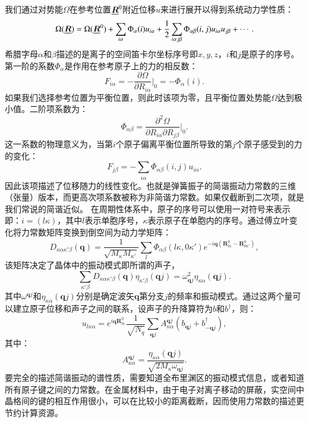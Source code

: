 我们通过对势能$\Omega$在参考位置$\underline{\bm{R}}^0$附近位移$u$来进行展开以得到系统动力学性质：
\begin{equation}
  \Omega(\underline{\bm{R}}) = \Omega(\underline{\bm{R}}^0) + \sum_{i\alpha} \Phi_\alpha(i)u_{i\alpha} + \frac{1}{2} \sum_{i\alpha j\beta} \Phi_{\alpha\beta}(i,j) u_{i\alpha}u_{j\beta} + \cdots .
\end{equation}
希腊字母$\alpha$和$\beta$描述的是离子的空间笛卡尔坐标序号即$x,y,z$，$i$和$j$是原子的序号。第一阶的系数$\Phi_\alpha$是作用在参考原子上的力的相反数：
\begin{equation}
  F_{i\alpha} = -\frac{\partial\Omega}{\partial R_{i\alpha}}\bigg|_0 = -\Phi_\alpha(i).
\end{equation}
如果我们选择参考位置为平衡位置，则此时该项为零，且平衡位置处势能$\Omega$达到极小值。二阶项系数为：
\begin{equation}\label{eq:omega_second_order}
  \Phi_{\alpha\beta} = \frac{\partial^2\Omega}{\partial R_{i\alpha}\partial R_{j\beta}} \bigg|_0 .
\end{equation}
这一系数的物理意义为，当第$i$个原子偏离平衡位置所导致的第$j$个原子感受到的力的变化：
\begin{equation}
  F_{j\beta} = -\sum_{i\alpha} \Phi_{\alpha\beta}(i,j)u_{i\alpha}.
\end{equation}
因此该项描述了位移随力的线性变化。也就是弹簧振子的简谐振动力常数的三维（张量）版本，而更高次项系数被称为非简谐力常数。如果仅截断到二次项，就是我们常说的简谐近似。
在周期性体系中，原子的序号可以使用一对符号来表示即：$i=(l\kappa)$，其中$l$表示单胞序号，$\kappa$表示原子在单胞内的序号。通过傅立叶变化将力常数矩阵变换到倒空间为动力学矩阵：
\begin{equation}
  D_{\kappa\alpha\kappa'\beta}(\bm{q}) = \frac{1}{\sqrt{M_\kappa M_{\kappa'}}} \sum_l \Phi_{\alpha\beta}(l\kappa,0\kappa')e^{-i\bm{q}(\bm{R}^0_{l\kappa}-\bm{R}^0_{0\kappa'})},
\end{equation}
该矩阵决定了晶体中的振动模式即所谓的声子，
\begin{equation}
  \sum_{\kappa'\beta}D_{\kappa\alpha\kappa'\beta}(\bm{q})\eta_{\kappa'\beta}(\bm{q}j) = \omega^2_{\bm{q}j}\eta_{\kappa\alpha}(\bm{q}j).
\end{equation}
其中$\omega^{\bm{q}j}$和$\eta_{\kappa\alpha}(\bm{q}j)$分别是确定波矢$\bm{q}$第分支$j$的频率和振动模式。通过这两个量可以建立原子位移和声子之间的联系，设声子的升降算符为$b$和$b^{\dagger}$，则：
\begin{equation}
  u_{l\kappa\alpha} = e^{i\bm{q}\bm{R}^0_{l\kappa}}\frac{1}{\sqrt{N_q}} \sum_{\bm{q}j} A^{\bm{q}j}_{\kappa\alpha}(b_{\bm{q}j} + b^{\dagger}_{-\bm{q}j}),
\end{equation}
其中：
\begin{equation}
  A^{\bm{q}j}_{\kappa\alpha} = \frac{\eta_{\kappa\alpha}(\bm{q}j)}{\sqrt{2M_\kappa \omega_{\bm{q}j}}}.
\end{equation}
要完全的描述简谐振动的谱性质，需要知道全布里渊区的振动模式信息，或者知道所有原子键之间的力常数。在金属材料中，由于电子对离子移动的屏蔽，实空间中晶格间的键的相互作用很小，可以在比较小的距离截断，因而使用力常数的描述更节约计算资源。

